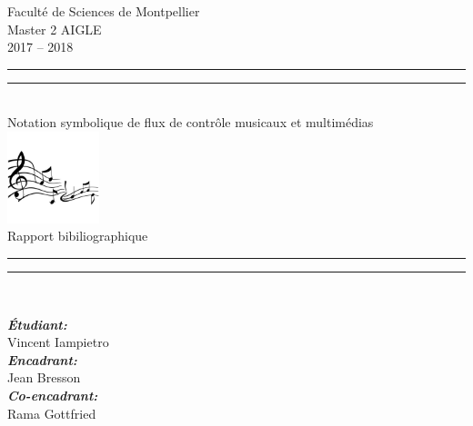 \begin{titlepage}
\begin{center}
\begin{sffamily}

{\large
Faculté de Sciences de Montpellier \\[.5cm]
Master 2 AIGLE\\2017 -- 2018\\[2cm]
}


\rule{\textwidth}{1.6pt}\vspace*{-\baselineskip}\vspace*{2pt} 
\rule{\textwidth}{0.4pt}\\[\baselineskip]
{\LARGE
Notation symbolique de flux de contrôle musicaux et multimédias\\[0.7\baselineskip]
\includegraphics[width=0.2\textwidth]{Paratextes/i/logo.jpg}
\\[0.5\baselineskip]
Rapport bibiliographique
}\\[0.2\baselineskip] 
\rule{\textwidth}{0.4pt}\vspace*{-\baselineskip}\vspace{3.2pt}
\rule{\textwidth}{1.6pt}\\[\baselineskip]
\vspace*{2\baselineskip}

\noindent
\begin{center}
     \large
    \emph{\textbf{Étudiant:}}\\
    Vincent Iampietro \\
    \smallskip
    \large
    \emph{\textbf{Encadrant:}}\\
    Jean Bresson\\
    \emph{\textbf{Co-encadrant:}}\\
    Rama Gottfried
\end{center}%



\end{sffamily}
\end{center}
\end{titlepage}